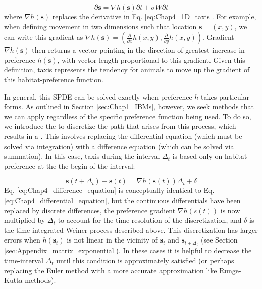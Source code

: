 \begin{equation} \label{eq:Chap4_differential_equation}
    \partial \mathbf{s} = \nabla h(\mathbf{s}) \partial t + \sigma W \partial t    
\end{equation}
where \( \nabla h(\mathbf{s})\) replaces the derivative in Eq. \ref{eq:Chap4_1D_taxis}. For example, when defining movement in two dimensions such that location \( \mathbf{s}=(x,y) \), we can write this gradient as \( \nabla h(\mathbf{s}) = ( \frac{\partial}{\partial x} h(x,y), \frac{\partial}{\partial y} h(x,y) ) \).  Gradient \( \nabla h(\mathbf{s}) \) then returns a vector pointing in the direction of greatest increase in preference \(h(\mathbf{s})\), with vector length proportional to this gradient.  Given this definition, taxis represents the tendency for animals to move up the gradient of this habitat-preference function.  

In general, this SPDE can be solved exactly when preference \(h\) takes particular forms.  As outlined in Section \ref{sec:Chap1_IBMs}, however, we seek methods that we can apply regardless of the specific preference function being used.  To do so, we introduce the  to discretize the path that arises from this process, which results in a .  This involves replacing the differential equation (which must be solved via integration) with a difference equation (which can be solved via summation).  In this case, taxis during the interval \(\Delta_t\) is based only on habitat preference at the the begin of the interval:

\begin{equation} \label{eq:Chap4_difference_equation}
    \mathbf{s}(t+\Delta_t) - \mathbf{s}(t) =  \nabla h(\mathbf{s}(t)) \Delta_t + \delta    
\end{equation}
Eq. \ref{eq:Chap4_difference_equation} is conceptually identical to Eq. \ref{eq:Chap4_differential_equation}, but the continuous differentials have been replaced by discrete differences, the preference gradient $\nabla h(s(t))$ is now multiplied by $\Delta_t$ to account for the time resolution of the discretization, and $\delta$ is the time-integrated Weiner process described above.  This discretization has larger errors when \( h(\mathbf{s}_t) \) is not linear in the vicinity of \(\mathbf{s}_t\) and \(\mathbf{s}_{t+\Delta_t}\) (see Section \ref{sec:Appendix_matrix_exponential}).  In these cases it is helpful to decrease the time-interval \( \Delta_t \) until this condition is approximately satisfied (or perhaps replacing the Euler method with a more accurate approximation like Runge-Kutta methods).   

